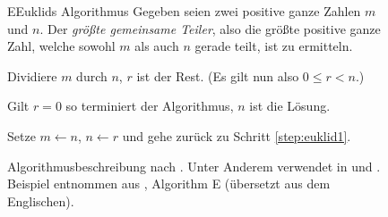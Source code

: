 \begin{figure}[hbt]
    \begin{algo}{E}{Euklids Algorithmus}
        Gegeben seien zwei positive ganze Zahlen $m$ und $n$. Der \emph{größte gemeinsame Teiler}, also die größte positive ganze Zahl, welche sowohl $m$ als auch $n$ gerade teilt, ist zu ermitteln.
    
        \begin{algosteps}
             Dividiere $m$ durch $n$, $r$ ist der Rest. (Es gilt nun also $0 \leq r < n$.)\label{step:euklid1}
    
             Gilt $r = 0$ so terminiert der Algorithmus, $n$ ist die Lösung.\label{step:euklid2}
            
            \algostep[Verringere.] Setze $m \leftarrow n$, $n \leftarrow r$ und gehe zurück zu Schritt \ref{step:euklid1}\label{step:euklid3}.
        \end{algosteps}
    \end{algo}
    \caption{Algorithmusbeschreibung nach \citeauthor{taocp1}. Unter Anderem verwendet in \cite{taocp1} und \cite{taocp3}. Beispiel entnommen aus \cite[2]{taocp1}, Algorithm E (übersetzt aus dem Englischen).}
    \label{fig:knuth-algorithm-specification}
\end{figure}

